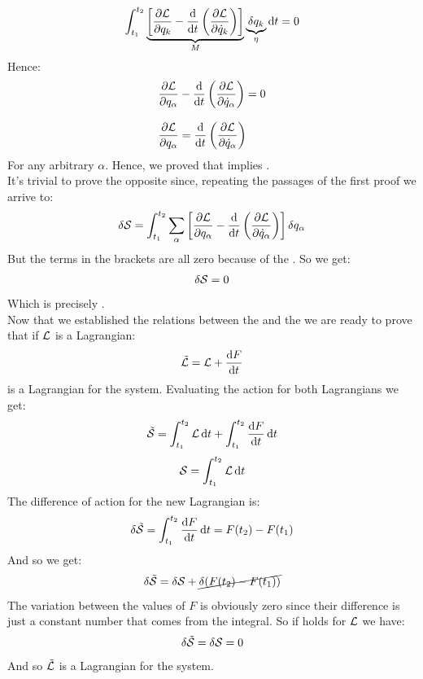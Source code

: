 \begin{equation}
    \int_{t_1}^{t_2}\underbrace{\sqbr{\pdv{ \lagr}{ q_{k}} - \dv{}{t}\brackets{\pdv{ \lagr}{ \dot{q}_{k}}}}}_{M} \underbrace{\delta q_{k}}_{\eta} \dd{t} = 0
\end{equation}
Hence:
\begin{equation}
    \begin{split}
      &\pdv{\lagr}{q_{\alpha}} - \dv{}{t}\brackets{\pdv{\lagr}{\dot{q}_{\alpha}}} = 0 \\[8pt]
      &\pdv{\lagr}{q_{\alpha}} = \dv{}{t}\brackets{\pdv{\lagr}{\dot{q}_{\alpha}}}
    \end{split}
\end{equation}
For any arbitrary $\alpha$. Hence, we proved that \hpquotemath\;implies \eleref.\\
It's trivial to prove the opposite since, repeating the passages of the first proof we arrive to:
\begin{equation}
    \delta \action = \int_{t_1}^{t_2}\bigsum_{\alpha}\sqbr{\pdv{\lagr}{q_{\alpha}} - \dv{}{t}\brackets{\pdv{\lagr}{\dot{q}_{\alpha}}}} \delta q_{\alpha}
\end{equation}
But the terms in the brackets are all zero because of the \eleref. So we get:
\begin{equation}
    \delta \mathcal{S} = 0
\end{equation}
Which is precisely \hpquotemath.\\
Now that we established the relations between the \eleref\;and the \hpquotemath\;we are ready to prove that if $\mathcal{L}$ is a Lagrangian:
\begin{equation}
    \tilde{\lagr} = \lagr + \dv{F}{t}
\end{equation}
is a Lagrangian for the system. Evaluating the action for both Lagrangians we get:
\begin{equation}
    \tilde{\mathcal{S}} = \int_{t_1}^{t_2}\mathcal{L} \dd{t} + \int_{t_1}^{t_2}\dfrac{\dd{F}}{\dd{t}} \dd{t}
\end{equation}
\begin{equation}
    \mathcal{S} = \int_{t_1}^{t_2}\mathcal{L} \dd{t}
\end{equation}
The difference of action for the new Lagrangian is:
\begin{equation}
    \delta \tilde{\mathcal{S}} = \int_{t_1}^{t_2}\dfrac{\dd{F}}{\dd{t}} \dd{t} = F(t_2) - F(t_1)
\end{equation}
And so we get:
\begin{equation}
    \delta \tilde{\mathcal{S}} = \delta \mathcal{S} + \cancel{\delta(F(t_2) - F(t_1))}
\end{equation}
The variation between the values of $F$ is obviously zero since their difference is just a constant number that comes from the integral. So if \hpquotemath\;holds for $\mathcal{L}$ we have:
\begin{equation}
    \delta \tilde{\mathcal{S}} = \delta \mathcal{S} = 0
\end{equation}
And so $\tilde{\mathcal{L}}$ is a Lagrangian for the system.\\
